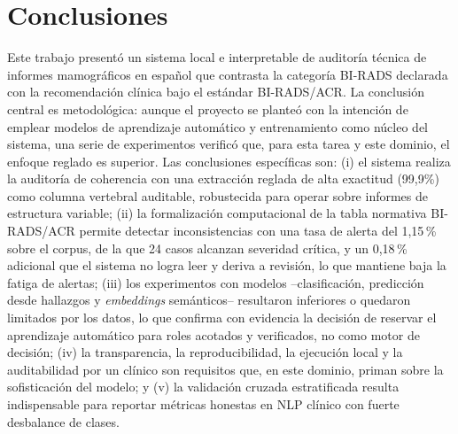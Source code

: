 \documentclass[10pt,journal,a4paper]{IEEEtran}
\begin{document}
\section{Conclusiones}
Este trabajo present\'o un sistema local e interpretable de auditor\'ia t\'ecnica de informes mamogr\'aficos en espa\~nol que contrasta la categor\'ia BI-RADS declarada con la recomendaci\'on cl\'inica bajo el est\'andar BI-RADS/ACR. La conclusi\'on central es metodol\'ogica: aunque el proyecto se plante\'o con la intenci\'on de emplear modelos de aprendizaje autom\'atico y entrenamiento como n\'ucleo del sistema, una serie de experimentos verific\'o que, para esta tarea y este dominio, el enfoque reglado es superior. Las conclusiones espec\'ificas son: (i) el sistema realiza la auditor\'ia de coherencia con una extracci\'on reglada de alta exactitud (99,9\%) como columna vertebral auditable, robustecida para operar sobre informes de estructura variable; (ii) la formalizaci\'on computacional de la tabla normativa BI-RADS/ACR permite detectar inconsistencias con una tasa de alerta del 1,15\,\% sobre el corpus, de la que 24 casos alcanzan severidad cr\'itica, y un 0,18\,\% adicional que el sistema no logra leer y deriva a revisi\'on, lo que mantiene baja la fatiga de alertas; (iii) los experimentos con modelos --clasificaci\'on, predicci\'on desde hallazgos y \emph{embeddings} sem\'anticos-- resultaron inferiores o quedaron limitados por los datos, lo que confirma con evidencia la decisi\'on de reservar el aprendizaje autom\'atico para roles acotados y verificados, no como motor de decisi\'on; (iv) la transparencia, la reproducibilidad, la ejecuci\'on local y la auditabilidad por un cl\'inico son requisitos que, en este dominio, priman sobre la sofisticaci\'on del modelo; y (v) la validaci\'on cruzada estratificada resulta indispensable para reportar m\'etricas honestas en NLP cl\'inico con fuerte desbalance de clases.
\end{document}
